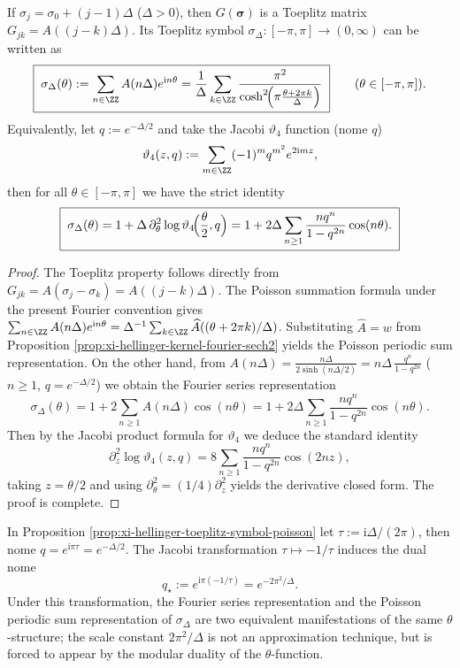 \begin{proposition}\label{prop:xi-hellinger-toeplitz-symbol-poisson}
If \(\sigma_j=\sigma_0+(j-1)\Delta\) (\(\Delta>0\)), then \(G(\boldsymbol{\sigma})\) is a Toeplitz matrix
\(
G_{jk}=A((j-k)\Delta)
\).
Its Toeplitz symbol \(\sigma_\Delta:[-\pi,\pi]\to(0,\infty)\) can be written as
\[
\boxed{\;
\sigma_\Delta(\theta)
:=\sum_{n\in\ZZ}A(n\Delta)e^{\mathrm{i}n\theta}
=\frac{1}{\Delta}\sum_{k\in\ZZ}\frac{\pi^{2}}{\cosh^{2}\!\Bigl(\pi\frac{\theta+2\pi k}{\Delta}\Bigr)}\;}
\qquad(\theta\in[-\pi,\pi]).
\]
Equivalently, let \(q:=e^{-\Delta/2}\) and take the Jacobi \(\vartheta_4\) function (nome \(q\))
\[
\vartheta_4(z,q):=\sum_{m\in\ZZ}(-1)^m q^{m^2}e^{2\mathrm{i}mz},
\]
then for all \(\theta\in[-\pi,\pi]\) we have the strict identity
\[
\boxed{\;
\sigma_\Delta(\theta)
=1+\Delta\,\partial_\theta^{2}\log\vartheta_4\!\Bigl(\frac{\theta}{2},q\Bigr)
=1+2\Delta\sum_{n\ge 1}\frac{nq^{n}}{1-q^{2n}}\cos(n\theta).\;}
\]
\end{proposition}
\begin{proof}
The Toeplitz property follows directly from \(G_{jk}=A(\sigma_j-\sigma_k)=A((j-k)\Delta)\).
The Poisson summation formula under the present Fourier convention gives
\(
\sum_{n\in\ZZ}A(n\Delta)e^{\mathrm{i}n\theta}
=\Delta^{-1}\sum_{k\in\ZZ}\widehat A((\theta+2\pi k)/\Delta)
\).
Substituting \(\widehat A=w\) from Proposition \ref{prop:xi-hellinger-kernel-fourier-sech2} yields the Poisson periodic sum representation.
On the other hand, from
\(
A(n\Delta)=\frac{n\Delta}{2\sinh(n\Delta/2)}
=n\Delta\,\frac{q^n}{1-q^{2n}}
\)
(\(n\ge 1\), \(q=e^{-\Delta/2}\)) we obtain the Fourier series representation
\[
\sigma_\Delta(\theta)=1+2\sum_{n\ge 1}A(n\Delta)\cos(n\theta)
=1+2\Delta\sum_{n\ge 1}\frac{nq^{n}}{1-q^{2n}}\cos(n\theta).
\]
Then by the Jacobi product formula for \(\vartheta_4\) we deduce the standard identity
\[
\partial_z^{2}\log\vartheta_4(z,q)
=8\sum_{n\ge 1}\frac{nq^{n}}{1-q^{2n}}\cos(2nz),
\]
taking \(z=\theta/2\) and using \(\partial_\theta^{2}=(1/4)\partial_z^{2}\) yields the derivative closed form. The proof is complete.
\end{proof}

\begin{remark}\label{rem:xi-hellinger-toeplitz-modular-duality-scale}
In Proposition \ref{prop:xi-hellinger-toeplitz-symbol-poisson} let \(\tau:=\mathrm{i}\Delta/(2\pi)\), then nome \(q=e^{\mathrm{i}\pi\tau}=e^{-\Delta/2}\).
The Jacobi transformation \(\tau\mapsto -1/\tau\) induces the dual nome
\[
q_\star:=e^{\mathrm{i}\pi(-1/\tau)}=e^{-2\pi^{2}/\Delta}.
\]
Under this transformation, the Fourier series representation and the Poisson periodic sum representation of \(\sigma_\Delta\) are two equivalent manifestations of the same \(\theta\)-structure;
the scale constant \(2\pi^{2}/\Delta\) is not an approximation technique, but is forced to appear by the modular duality of the \(\theta\)-function.
\end{remark}

